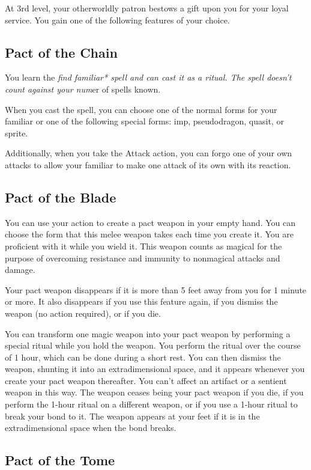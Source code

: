 At 3rd level, your otherworldly patron bestows a gift upon you for your loyal service. You gain one of the following features of your choice.

\subsection{Pact of the Chain}

You learn the \textit{find familiar* spell and can cast it as a ritual. The spell doesn’t count against your num}er of spells known.

When you cast the spell, you can choose one of the normal forms for your familiar or one of the following special forms: imp, pseudodragon, quasit, or sprite.

Additionally, when you take the Attack action, you can forgo one of your own attacks to allow your familiar to make one attack of its own with its reaction.

\subsection{Pact of the Blade}

You can use your action to create a pact weapon in your empty hand. You can choose the form that this melee weapon takes each time you create it. You are proficient with it while you wield it. This weapon counts as magical for the purpose of overcoming resistance and immunity to nonmagical attacks and damage.

Your pact weapon disappears if it is more than 5 feet away from you for 1 minute or more. It also disappears if you use this feature again, if you dismiss the weapon (no action required), or if you die.

You can transform one magic weapon into your pact weapon by performing a special ritual while you hold the weapon. You perform the ritual over the course of 1 hour, which can be done during a short rest. You can then dismiss the weapon, shunting it into an extradimensional space, and it appears whenever you create your pact weapon thereafter. You can’t affect an artifact or a sentient weapon in this way. The weapon ceases being your pact weapon if you die, if you perform the 1-hour ritual on a different weapon, or if you use a 1-hour ritual to break your bond to it. The weapon appears at your feet if it is in the extradimensional space when the bond breaks.

\subsection{Pact of the Tome}


